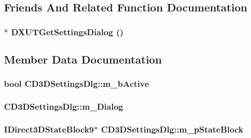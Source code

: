 \subsection{Friends And Related Function Documentation}
\hypertarget{class_c_d3_d_settings_dlg_a48e0861d43a45a17f8ab5e9d46efa7c9}{
\subsubsection[{DXUTGetSettingsDialog}]{$\ast$ DXUTGetSettingsDialog ()}}
\label{class_c_d3_d_settings_dlg_a48e0861d43a45a17f8ab5e9d46efa7c9}


\subsection{Member Data Documentation}
\hypertarget{class_c_d3_d_settings_dlg_ad080d36c3e4fc29a7909a7962b11fa78}{
\subsubsection[{m\_\-bActive}]{\setlength{\rightskip}{0pt plus 5cm}bool {\bf CD3DSettingsDlg::m\_\-bActive}}}
\label{class_c_d3_d_settings_dlg_ad080d36c3e4fc29a7909a7962b11fa78}
\hypertarget{class_c_d3_d_settings_dlg_a6653f7f7899c31f909c2d7542babc521}{
\subsubsection[{m\_\-Dialog}]{ {\bf CD3DSettingsDlg::m\_\-Dialog}}}
\label{class_c_d3_d_settings_dlg_a6653f7f7899c31f909c2d7542babc521}
\hypertarget{class_c_d3_d_settings_dlg_af8e1e88711501924bd091fe0792cb489}{
\subsubsection[{m\_\-pStateBlock}]{\setlength{\rightskip}{0pt plus 5cm}IDirect3DStateBlock9$\ast$ {\bf CD3DSettingsDlg::m\_\-pStateBlock}}}
\label{class_c_d3_d_settings_dlg_af8e1e88711501924bd091fe0792cb489}


